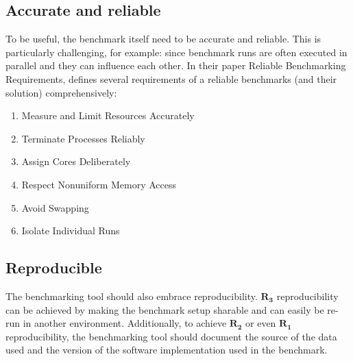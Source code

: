 \subsection{Accurate and reliable}
To be useful, the benchmark itself need to be accurate and reliable.
This is particularly challenging, for example: since benchmark runs are often executed in parallel and they can influence each other.
In their paper Reliable Benchmarking Requirements, \citet{beyerReliableBenchmarkingRequirements2019} defines several requirements of a reliable benchmarks (and their solution) comprehensively:
\begin{enumerate}[noitemsep]
	\item Measure and Limit Resources Accurately
	\item Terminate Processes Reliably
	\item Assign Cores Deliberately
	\item Respect Nonuniform Memory Access
	\item Avoid Swapping
	\item Isolate Individual Runs
\end{enumerate}

\subsection{Reproducible}
The benchmarking tool should also embrace reproducibility.
$\bm{R_3}$ reproducibility can be achieved by making the benchmark setup sharable and can easily be re-run in another environment.
Additionally, to achieve $\bm{R_2}$ or even $\bm{R_1}$ reproducibility, the benchmarking tool should document the source of the data used and the version of the software implementation used in the benchmark.
